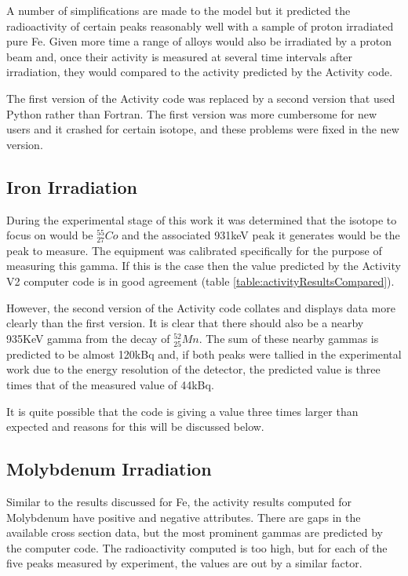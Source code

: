 A number of simplifications are made to the model but it predicted the radioactivity of certain peaks reasonably well with a sample of proton irradiated pure Fe.  Given more time a range of alloys would also be irradiated by a proton beam and, once their activity is measured at several time intervals after irradiation, they would compared to the activity predicted by the Activity code.

The first version of the Activity code was replaced by a second version that used Python rather than Fortran.  The first version was more cumbersome for new users and it crashed for certain isotope, and these problems were fixed in the new version.



\subsection{Iron Irradiation}

During the experimental stage of this work it was determined that the isotope to focus on would be ${}^{55}_{27} Co$ and the associated 931keV peak it generates would be the peak to measure.  The equipment was calibrated specifically for the purpose of measuring this gamma.  If this is the case then the value predicted by the Activity V2 computer code is in good agreement (table \ref{table:activityResultsCompared}). 

However, the second version of the Activity code collates and displays data more clearly than the first version.  It is clear that there should also be a nearby 935KeV gamma from the decay of ${}^{52}_{25}Mn$.  The sum of these nearby gammas is predicted to be almost 120kBq and, if both peaks were tallied in the experimental work due to the energy resolution of the detector, the predicted value is three times that of the measured value of 44kBq.

It is quite possible that the code is giving a value three times larger than expected and reasons for this will be discussed below.


\subsection{Molybdenum Irradiation}

Similar to the results discussed for Fe, the activity results computed for Molybdenum have positive and negative attributes.  There are gaps in the available cross section data, but the most prominent gammas are predicted by the computer code.  The radioactivity computed is too high, but for each of the five peaks measured by experiment, the values are out by a similar factor.


